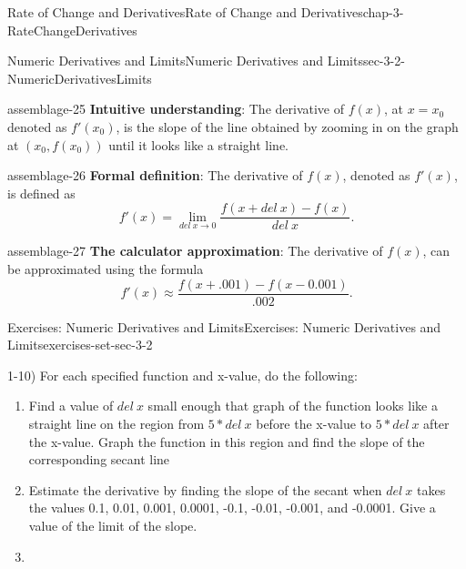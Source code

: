 \documentclass[oneside,10pt,]{book}
\newcommand{\terminology}[1]{\textbf{#1}}
\numberwithin{equation}{section}
\begin{document}
\begin{chapterptx}{Rate of Change and Derivatives}{}{Rate of Change and Derivatives}{}{}{chap-3-RateChangeDerivatives}
\begin{sectionptx}{Numeric Derivatives and Limits}{}{Numeric Derivatives and Limits}{}{}{sec-3-2-NumericDerivativesLimits}
\begin{assemblage}{}{assemblage-25}%
\hypertarget{p-1051}{}%
\terminology{Intuitive understanding}: The derivative of \(f(x)\), at \(x=x_0\) denoted as \(f'(x_0)\),   is the slope of the line obtained by zooming in on the graph at \((x_0,f(x_0 ))\) until it looks like a straight line.%
\end{assemblage}
\begin{assemblage}{}{assemblage-26}%
\hypertarget{p-1052}{}%
\terminology{Formal definition}:  The derivative of \(f(x)\), denoted as \(f'(x)\), is defined as%
\begin{equation*}
f'(x)=\lim_{del\ x\to 0} \frac{f(x+del\ x)-f(x)}{del\ x}.
\end{equation*}
%
\end{assemblage}
\begin{assemblage}{}{assemblage-27}%
\hypertarget{p-1053}{}%
\terminology{The calculator approximation}:  The derivative of \(f(x)\), can be approximated using the formula%
\begin{equation*}
f'(x)\approx \frac{f(x+.001)-f(x-0.001)}{.002}.
\end{equation*}
%
\end{assemblage}
%
%
\typeout{************************************************}
\typeout{************************************************}
%
\begin{exercises-subsection-numberless}{Exercises: Numeric Derivatives and Limits}{}{Exercises: Numeric Derivatives and Limits}{}{}{exercises-set-sec-3-2}
\par\medskip\noindent%
\hypertarget{exercisegroup-15}{}%
\hypertarget{p-1054}{}%
1-10) For each specified function and x-value, do the following:%
\leavevmode%
\begin{enumerate}[label=(\alph*)]
\item\hypertarget{li-317}{}\hypertarget{p-1055}{}%
Find a value of \(del\ x\) small enough that graph of the function looks like a straight line on the region from \(5*del\ x\) before the x-value to \(5*del\ x\) after the x-value.  Graph the function in this region and find the slope of the corresponding secant line%
\item\hypertarget{li-318}{}\hypertarget{p-1056}{}%
Estimate the derivative by finding the slope of the secant when \(del\ x\) takes the values 0.1, 0.01, 0.001, 0.0001, -0.1, -0.01, -0.001, and -0.0001.  Give a value of the limit of the slope.%
\item\hypertarget{li-319}{}\hypertarget{p-1057}{}%

\end{enumerate}
\end{exercises-subsection-numberless}
\end{sectionptx}
\end{chapterptx}
\end{document}
